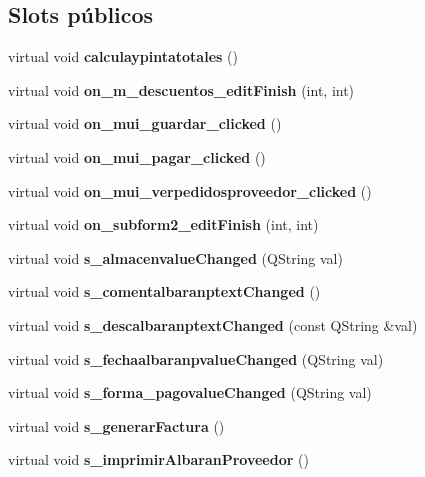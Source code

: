 \subsection*{Slots p\'{u}blicos}
\begin{CompactItemize}
\item 
virtual void {\bf calculaypintatotales} ()\label{classAlbaranProveedorView_i0}

\item 
virtual void {\bf on\_\-m\_\-descuentos\_\-edit\-Finish} (int, int)\label{classAlbaranProveedorView_i1}

\item 
virtual void {\bf on\_\-mui\_\-guardar\_\-clicked} ()\label{classAlbaranProveedorView_i2}

\item 
virtual void {\bf on\_\-mui\_\-pagar\_\-clicked} ()\label{classAlbaranProveedorView_i3}

\item 
virtual void {\bf on\_\-mui\_\-verpedidosproveedor\_\-clicked} ()\label{classAlbaranProveedorView_i4}

\item 
virtual void {\bf on\_\-subform2\_\-edit\-Finish} (int, int)\label{classAlbaranProveedorView_i5}

\item 
virtual void {\bf s\_\-almacenvalue\-Changed} (QString val)\label{classAlbaranProveedorView_i6}

\item 
virtual void {\bf s\_\-comentalbaranptext\-Changed} ()\label{classAlbaranProveedorView_i7}

\item 
virtual void {\bf s\_\-descalbaranptext\-Changed} (const QString \&val)\label{classAlbaranProveedorView_i8}

\item 
virtual void {\bf s\_\-fechaalbaranpvalue\-Changed} (QString val)\label{classAlbaranProveedorView_i9}

\item 
virtual void {\bf s\_\-forma\_\-pagovalue\-Changed} (QString val)\label{classAlbaranProveedorView_i10}

\item 
virtual void {\bf s\_\-generar\-Factura} ()\label{classAlbaranProveedorView_i11}

\item 
virtual void {\bf s\_\-imprimir\-Albaran\-Proveedor} ()\label{classAlbaranProveedorView_i12}


\end{CompactItemize}
